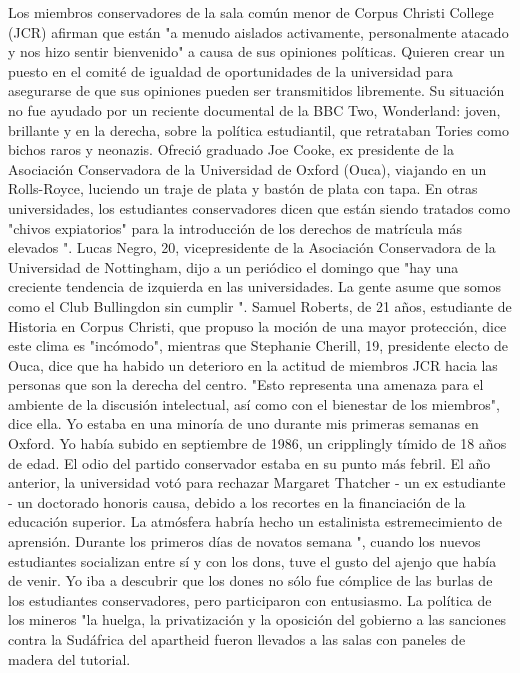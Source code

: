 Los miembros conservadores de la sala común menor de Corpus Christi College (JCR) afirman que están "a menudo aislados activamente, personalmente atacado y nos hizo sentir bienvenido" a causa de sus opiniones políticas.
Quieren crear un puesto en el comité de igualdad de oportunidades de la universidad para asegurarse de que sus opiniones pueden ser transmitidos libremente.
Su situación no fue ayudado por un reciente documental de la BBC Two, Wonderland: joven, brillante y en la derecha, sobre la política estudiantil, que retrataban Tories como bichos raros y neonazis.
Ofreció graduado Joe Cooke, ex presidente de la Asociación Conservadora de la Universidad de Oxford (Ouca), viajando en un Rolls-Royce, luciendo un traje de plata y bastón de plata con tapa.
En otras universidades, los estudiantes conservadores dicen que están siendo tratados como "chivos expiatorios" para la introducción de los derechos de matrícula más elevados ".
Lucas Negro, 20, vicepresidente de la Asociación Conservadora de la Universidad de Nottingham, dijo a un periódico el domingo que "hay una creciente tendencia de izquierda en las universidades.
La gente asume que somos como el Club Bullingdon sin cumplir ".
Samuel Roberts, de 21 años, estudiante de Historia en Corpus Christi, que propuso la moción de una mayor protección, dice este clima es "incómodo", mientras que Stephanie Cherill, 19, presidente electo de Ouca, dice que ha habido un deterioro en la actitud de miembros JCR hacia las personas que son la derecha del centro.
"Esto representa una amenaza para el ambiente de la discusión intelectual, así como con el bienestar de los miembros", dice ella.
Yo estaba en una minoría de uno durante mis primeras semanas en Oxford.
Yo había subido en septiembre de 1986, un cripplingly tímido de 18 años de edad.
El odio del partido conservador estaba en su punto más febril.
El año anterior, la universidad votó para rechazar Margaret Thatcher - un ex estudiante - un doctorado honoris causa, debido a los recortes en la financiación de la educación superior.
La atmósfera habría hecho un estalinista estremecimiento de aprensión.
Durante los primeros días de novatos semana ", cuando los nuevos estudiantes socializan entre sí y con los dons, tuve el gusto del ajenjo que había de venir.
Yo iba a descubrir que los dones no sólo fue cómplice de las burlas de los estudiantes conservadores, pero participaron con entusiasmo.
La política de los mineros "la huelga, la privatización y la oposición del gobierno a las sanciones contra la Sudáfrica del apartheid fueron llevados a las salas con paneles de madera del tutorial.
